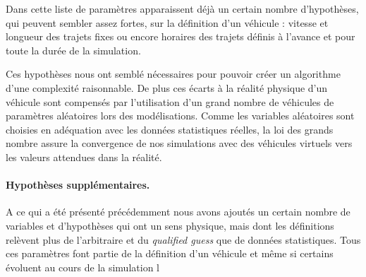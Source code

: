 \documentclass[10pt]{article}
\begin{document}
		Dans cette liste de paramètres apparaissent déjà un certain nombre d'hypothèses, qui peuvent sembler assez fortes, sur la définition d'un véhicule : vitesse et longueur des trajets fixes ou encore horaires des trajets définis à l'avance et pour toute la durée de la simulation.
		
		Ces hypothèses nous ont semblé nécessaires pour pouvoir créer un algorithme d'une complexité raisonnable. De plus ces écarts à la réalité physique d'un véhicule sont compensés par l'utilisation d'un grand nombre de véhicules de paramètres aléatoires lors des modélisations. Comme les variables aléatoires sont choisies en adéquation avec les données statistiques réelles, la loi des grands nombre assure la convergence de nos simulations avec des véhicules virtuels vers les valeurs attendues dans la réalité.
		
		\paragraph{Hypothèses supplémentaires.} A ce qui a été présenté précédemment nous avons ajoutés un certain nombre de variables et d'hypothèses qui ont un sens physique, mais dont les définitions relèvent plus de l'arbitraire et du \emph{qualified guess} que de données statistiques. Tous ces paramètres font partie de la définition d'un véhicule et même si certains évoluent au cours de la simulation l
		
\end{document}
